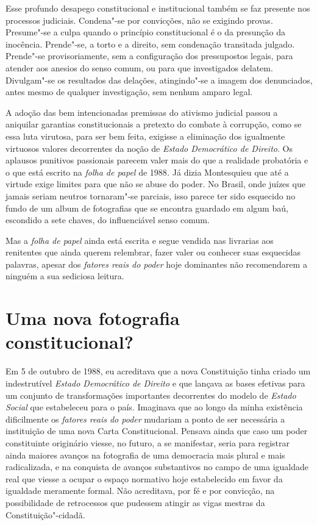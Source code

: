 Esse profundo desapego constitucional e institucional também se faz
presente nos processos judiciais. Condena"-se por convicções, não se
exigindo provas. Presume"-se a culpa quando o princípio constitucional é
o da presunção da inocência. Prende"-se, a torto e a direito, sem
condenação transitada julgado. Prende"-se provisoriamente, sem a
configuração dos pressupostos legais, para atender aos anesios do senso
comum, ou para que investigados delatem. Divulgam"-se os resultados das
delações, atingindo"-se a imagem dos denunciados, antes mesmo de qualquer
investigação, sem nenhum amparo legal.

A adoção das bem intencionadas premissas do ativismo judicial passou a
aniquilar garantias constitucionais a pretexto do combate à corrupção,
como se essa luta virutosa, para ser bem feita, exigisse a eliminação
dos igualmente virtuosos valores decorrentes da noção de \emph{Estado
Democrático de Direito}. Os aplausos punitivos passionais parecem valer
mais do que a realidade probatória e o que está escrito na \emph{folha
de papel} de 1988\emph{.} Já dizia Montesquieu que até a virtude exige
limites para que não se abuse do poder. No Brasil, onde juízes que
jamais seriam neutros tornaram"-se parciais, isso parece ter sido
esquecido no fundo de um album de fotografias que se encontra guardado
em algum baú, escondido a sete chaves, do influenciável senso comum.

Mas a \emph{folha de papel} ainda está escrita e segue vendida nas
livrarias aos renitentes que ainda querem relembrar, fazer valer ou
conhecer suas esquecidas palavras, apesar dos \emph{fatores reais do
poder} hoje dominantes não recomendarem a ninguém a sua sediciosa
leitura.

\section{Uma nova fotografia constitucional?}

Em 5 de outubro de 1988, eu acreditava que a nova Constituição tinha
criado um indestrutível \emph{Estado Democrático de Direito} e que
lançava as bases efetivas para um conjunto de transformações importantes
decorrentes do modelo de \emph{Estado Social} que estabeleceu para o
país. Imaginava que ao longo da minha existência dificilmente os
\emph{fatores reais do poder} mudariam a ponto de ser necessária a
instituição de uma nova Carta Constitucional. Pensava ainda que caso um
poder constituinte originário viesse, no futuro, a se manifestar, seria
para registrar ainda maiores avanços na fotografia de uma democracia
mais plural e mais radicalizada, e na conquista de avanços substantivos
no campo de uma igualdade real que viesse a ocupar o espaço normativo
hoje estabelecido em favor da igualdade meramente formal. Não
acreditava, por fé e por convicção, na possibilidade de retrocessos que
pudessem atingir as vigas mestras da Constituição"-cidadã.

